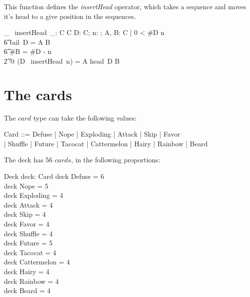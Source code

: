 \documentclass[11pt, fuzz]{article}
\begin{document}
This function defines the \emph{insertHead} operator, which takes a sequence and moves it's head to a give position in the sequences. 

\newcommand{\insertHead}{~insertHead~}

\begin{gendef}[C]
    \_ \insertHead \_: \seq C \cross \nat \fun \seq C
\where
    \forall D: \seq C; n: \nat; A, B: \seq C | 0 < \#D \leq n\\
    \t6 \land tail~D = A \cat B\\
    \t6 \land \#B = \#D - n\\
    \t2 @ (D \insertHead n) = A \cat \langle head~D \rangle \cat B
\end{gendef}

\section{The cards}

The $card$ type can take the following values:

\begin{zed}
    Card ::= Defuse | Nope | Exploding | Attack | Skip | Favor \\| Shuffle | Future | Tacocat | Cattermelon | Hairy | Rainbow | Beard
\end{zed}

The deck has 56 $cards$, in the following proportions:

\begin{schema}{Deck}
    deck: \bag Card
\where
    deck \bcount Defuse      = 6 \\
    deck \bcount Nope        = 5 \\
    deck \bcount Exploding   = 4 \\
    deck \bcount Attack      = 4 \\
    deck \bcount Skip        = 4 \\
    deck \bcount Favor       = 4 \\
    deck \bcount Shuffle     = 4 \\
    deck \bcount Future      = 5 \\
    deck \bcount Tacocat     = 4 \\
    deck \bcount Cattermelon = 4 \\
    deck \bcount Hairy       = 4 \\
    deck \bcount Rainbow     = 4 \\
    deck \bcount Beard       = 4 \\
\end{schema}
\end{document}

